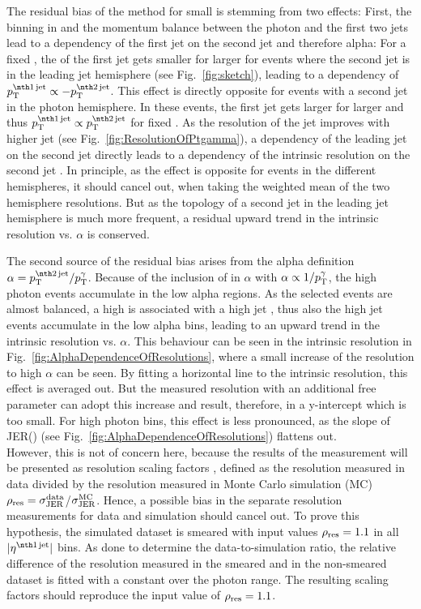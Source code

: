 The residual bias of the method for small \ptgamma is stemming from two effects: 
First, the binning in \ptgamma and the momentum balance between the photon and the first two jets lead to a dependency of the first jet \pt on the second jet \pt and therefore alpha: 
For a fixed \ptgamma, the \pt of the first jet gets smaller for larger \ptsecondjet for events where the second jet is in the leading jet hemisphere (see Fig.~\ref{fig:sketch}), 
leading to a dependency of $\ptfirstjet \propto -\ptsecondjet$.
This effect is directly opposite for events with a second jet in the photon hemisphere. 
In these events, the first jet \pt gets larger for larger \ptsecondjet and thus $\ptfirstjet \propto \ptsecondjet$ for fixed \ptgamma. 
As the resolution of the jet improves with higher jet \pt (see Fig.~\ref{fig:ResolutionOfPtgamma}), a dependency of the leading jet \pt on the second jet \pt directly leads to a dependency of the intrinsic resolution on the second jet \pt. 
In principle, as the effect is opposite for events in the different hemispheres, it should cancel out, when taking the weighted mean of the two hemisphere resolutions. 
But as the topology of a second jet in the leading jet hemisphere is much more frequent, a residual upward trend in the intrinsic resolution vs. $\alpha$ is conserved. 

The second source of the residual bias arises from the alpha definition $\alpha = \ptsecondjet/\ptgamma$. 
Because of the inclusion of \ptgamma in $\alpha$ with $\alpha \propto 1/{p}_\mathrm{T}^{\gamma}$, 
the high photon \pt events accumulate in the low alpha regions. 
As the selected events are almost balanced, a high \ptgamma is associated with a high jet \pt, thus also the high jet \pt events accumulate in the low alpha bins, leading to  an upward trend in the intrinsic resolution vs. $\alpha$. 
This behaviour can be seen in the intrinsic resolution in Fig.~\ref{fig:AlphaDependenceOfResolutions}, where a small increase of the resolution to high $\alpha$ can be seen. 
By fitting a horizontal line to the intrinsic resolution, this effect is averaged out. 
But the measured resolution with an additional free parameter can adopt this increase and result, therefore, in a y-intercept which is too small. 
For high photon \pt bins, this effect is less pronounced, as the slope of JER(\ptgamma) (see Fig.~\ref{fig:AlphaDependenceOfResolutions}) flattens out.\\

However, this is not of concern here, because the results of the measurement will be presented as resolution scaling factors \rhores, defined as the resolution measured in data divided by the resolution measured in Monte Carlo simulation (MC) $\rho_\mathrm{res} = \sigma_\mathrm{JER}^{\text{data}}$/$\sigma_\mathrm{JER}^{\text{MC}}$. 
Hence, a possible bias in the separate resolution measurements for data and simulation should cancel out. 
To prove this hypothesis, the simulated dataset is smeared with input values $\rho_\mathrm{res} =1.1$ in all $|\etafirstjet|$ bins. 
As done to determine the data-to-simulation ratio, the relative difference of the resolution measured in the smeared and in the non-smeared dataset is fitted with a constant over the photon \pt range.
The resulting scaling factors \rhores should reproduce the input value of $\rho_\mathrm{res}=1.1$.

